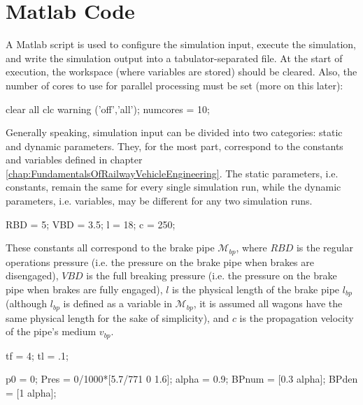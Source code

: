 \section{Matlab Code}
\label{sec:MatlabCode}
\par\noindent
A Matlab script is used to configure the simulation input, execute the simulation, and write the simulation output into a tabulator-separated file. At the start of execution, the workspace (where variables are stored) should be cleared. Also, the number of cores to use for parallel processing must be set (more on this later):

\bigskip
\begin{python}
clear all
clc
warning ('off','all');
numcores = 10;
\end{python}
\bigskip

\noindent
Generally speaking, simulation input can be divided into two categories: static and dynamic parameters. They, for the most part, correspond to the constants and variables defined in chapter \ref{chap:FundamentalsOfRailwayVehicleEngineering}. The static parameters, i.e. constants, remain the same for every single simulation run, while the dynamic parameters, i.e. variables, may be different for any two simulation runs.

\bigskip
\begin{python}
RBD = 5; 
VBD = 3.5; 
l = 18; 
c = 250; 
\end{python}
\bigskip

\noindent
These constants all correspond to the brake pipe ${\mathcal{M}}_{bp}$, where $RBD$ is the regular operations pressure (i.e. the pressure on the brake pipe when brakes are disengaged), $VBD$ is the full breaking pressure (i.e. the pressure on the brake pipe when brakes are fully engaged), $l$ is the physical length of the brake pipe $l_{bp}$ (although $l_{bp}$ is defined as a variable in ${\mathcal{M}}_{bp}$, it is assumed all wagons have the same physical length for the sake of simplicity), and $c$ is the propagation velocity of the pipe's medium $v_{bp}$.

\bigskip
\begin{python}
tf = 4;
tl = .1;
\end{python}
\bigskip

\noindent
\TODO{}

\bigskip
\begin{python}
p0 = 0;
Pres = 0/1000*[5.7/771 0 1.6];
alpha = 0.9;
BPnum = [0.3 alpha];
BPden = [1 alpha];
\end{python}
\bigskip

